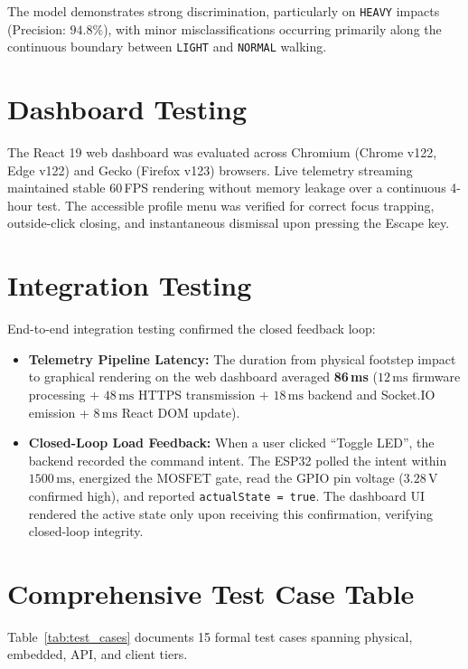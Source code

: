 The model demonstrates strong discrimination, particularly on \texttt{HEAVY} impacts (Precision: $94.8\%$), with minor misclassifications occurring primarily along the continuous boundary between \texttt{LIGHT} and \texttt{NORMAL} walking.

\section{Dashboard Testing}
The React 19 web dashboard was evaluated across Chromium (Chrome v122, Edge v122) and Gecko (Firefox v123) browsers. Live telemetry streaming maintained stable 60\,FPS rendering without memory leakage over a continuous 4-hour test. The accessible profile menu was verified for correct focus trapping, outside-click closing, and instantaneous dismissal upon pressing the Escape key.

\section{Integration Testing}
End-to-end integration testing confirmed the closed feedback loop:
\begin{itemize}
    \item \textbf{Telemetry Pipeline Latency:} The duration from physical footstep impact to graphical rendering on the web dashboard averaged \textbf{86\,ms} ($12\,\text{ms}$ firmware processing + $48\,\text{ms}$ HTTPS transmission + $18\,\text{ms}$ backend and Socket.IO emission + $8\,\text{ms}$ React DOM update).
    \item \textbf{Closed-Loop Load Feedback:} When a user clicked ``Toggle LED'', the backend recorded the command intent. The ESP32 polled the intent within $1500\,\text{ms}$, energized the MOSFET gate, read the GPIO pin voltage ($3.28\,\text{V}$ confirmed high), and reported \texttt{actualState = true}. The dashboard UI rendered the active state only upon receiving this confirmation, verifying closed-loop integrity.
\end{itemize}

\section{Comprehensive Test Case Table}
Table~\ref{tab:test_cases} documents 15 formal test cases spanning physical, embedded, API, and client tiers.

